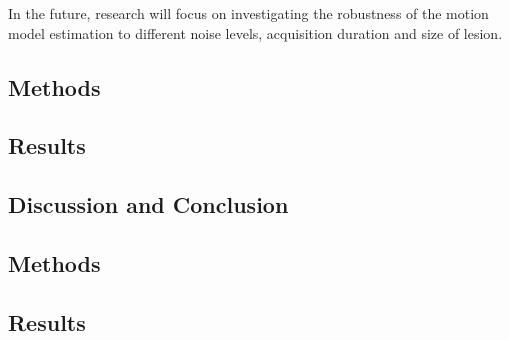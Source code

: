             In the future, research will focus on investigating the robustness of the motion model estimation to different noise levels, acquisition duration and size of lesion.
    
        \blindtext
        
        \subsection{Methods} \label{impact_of_tof_on_respiratory_motion_modelling_using_nac_pet_an_extension_to_inter_and_intra_respiratory_cycle_variation_methods}
            \blindtext
            
        \subsection{Results} \label{impact_of_tof_on_respiratory_motion_modelling_using_nac_pet_an_extension_to_inter_and_intra_respiratory_cycle_variation_results}
            \blindtext
            
        \subsection{Discussion and Conclusion} \label{impact_of_tof_on_respiratory_motion_modelling_using_nac_pet_an_extension_to_inter_and_intra_respiratory_cycle_variation_discussion_and_conclusion}
            \blindtext
    
        \blindtext
        
        \subsection{Methods} \label{extension_of_static_pca_based_data_driven_surrogate_signal_extraction_to_dynamic_pet_methods}
            \blindtext
            
        \subsection{Results} \label{extension_of_static_pca_based_data_driven_surrogate_signal_extraction_to_dynamic_pet_results}
            \blindtext
            
